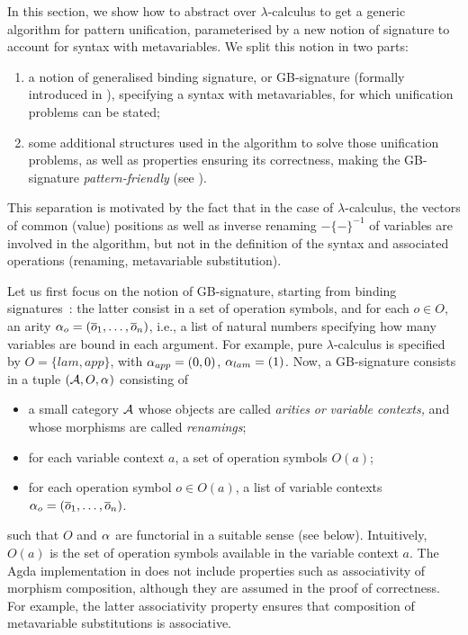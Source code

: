 \label{subsec:intro-generic}In this section, we show how to abstract
over $\lambda$-calculus to get a generic algorithm for pattern unification,
parameterised by a new notion of signature to account for syntax with
metavariables. We split this notion in two parts: 
\begin{enumerate}
\item a notion of generalised binding signature, or GB-signature (formally
introduced in ), specifying a syntax with metavariables,
for which unification problems can be stated; 
\item some additional structures used in the algorithm to solve those unification
problems, as well as properties ensuring its correctness, making the
GB-signature \emph{pattern-friendly} (see ).
\end{enumerate}
This separation is motivated by the fact that in the case of $\lambda$-calculus,
the vectors of common (value) positions as well as inverse renaming
$-\{-\}^{-1}$ of variables are involved in the algorithm, but not
in the definition of the syntax and associated operations (renaming,
metavariable substitution).

Let us first focus on the notion of GB-signature, starting from binding
signatures~\citet{aczel2016general}: the latter consist in a set
of operation symbols, and for each $o\in O$, an arity $\ntharvec o=(\nthar o1,\dots,\nthar on)$,
i.e., a list of natural numbers specifying how many variables are
bound in each argument. For example, pure $\lambda$-calculus is specified
by $O=\{lam,app\}$, with $\ntharvec{app}=(0,0)$, $\ntharvec{lam}=(1)$.
Now, a GB-signature consists in a tuple $({\cal A},O,\ntharvecfunct)$
consisting of 
\begin{itemize}
\item a small category ${\cal A}$ whose objects are called \emph{arities}\textit{
}\textit{\emph{or}}\textit{ variable contexts}\textit{\emph{,}} and
whose morphisms are called \textit{renamings};
\item for each variable context $a$, a set of operation symbols $O(a)$;
\item for each operation symbol $o\in O(a)$, a list of variable contexts
$\ntharvec o=(\nthar o1,\dots,\nthar on)$.
\end{itemize}
such that $O$ and $\ntharvecfunct$ are functorial in a suitable
sense (see  below). Intuitively, $O(a)$
is the set of operation symbols available in the variable context
$a$. The Agda implementation in  does not include
properties such as associativity of morphism composition, although
they are assumed in the proof of correctness. For example, the latter
associativity property ensures that composition of metavariable substitutions
is associative.

